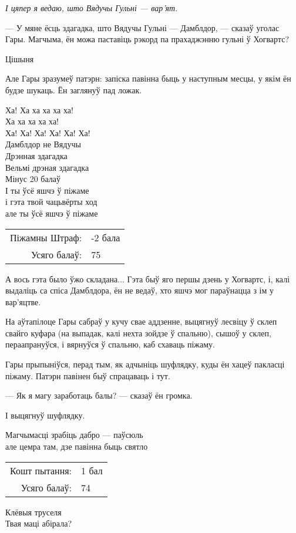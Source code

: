 \emph{І цяпер я ведаю, што Вядучы Гульні --- вар'ят.}

--- У мяне ёсць здагадка, што Вядучы Гульні --- Дамблдор, --- сказаў уголас Гары.
Магчыма, ён можа паставіць рэкорд па прахаджэнню гульні ў Хогвартс?

Цішыня

Але Гары зразумеў патэрн: запіска павінна быць у наступным месцы, у якім ён
будзе шукаць. Ён заглянуў пад ложак.

\begin{writtenNoteGame}
Ха! Ха ха ха ха ха!\\
Ха ха ха ха ха!\\
Ха! Ха! Ха! Ха! Ха! Ха!\\
Дамблдор не Вядучы\\
Дрэнная здагадка\\
Вельмі дрэная здагадка\\
Мінус 20 балаў\\
І ты ўсё яшчэ ў піжаме\\
і гэта твой чацьвёрты ход\\
але ты ўсё яшчэ ў піжаме

\begin{tabular}{rl}
Піжамны Штраф: & -2 бала\\
Усяго балаў: & 75
\end{tabular}
\end{writtenNoteGame}


А вось гэта было ўжо складана... Гэта быў яго першы дзень у Хогвартс, і, калі 
выдаліць са спіса Дамблдора, ён не ведаў, хто яшчэ мог параўнацца з ім 
у вар'яцтве.

На аўтапілоце Гары сабраў у кучу свае аддзенне, выцягнуў лесвіцу ў склеп свайго 
куфара (на выпадак, калі нехта зойдзе ў спальню), сышоў у склеп, пераапрануўся, і вярнуўся ў спальню,
каб схаваць піжаму. 

Гары прыпыніўся, перад тым, як адчыніць шуфлядку, куды ён хацеў пакласці
піжаму. Патэрн павінен быў спрацаваць і тут.

--- Як я магу заработаць балы? --- сказаў ён громка.

І выцягнуў шуфлядку.

\begin{writtenNoteGame}
Магчымасці зрабіць дабро --- паўсюль\\
але цемра там, дзе павінна быць святло

\begin{tabular}{rl}
Кошт пытання: & 1 бал\\
Усяго балаў: & 74
\end{tabular}

Клёвыя труселя\\
Твая маці абірала?
\end{writtenNoteGame}

